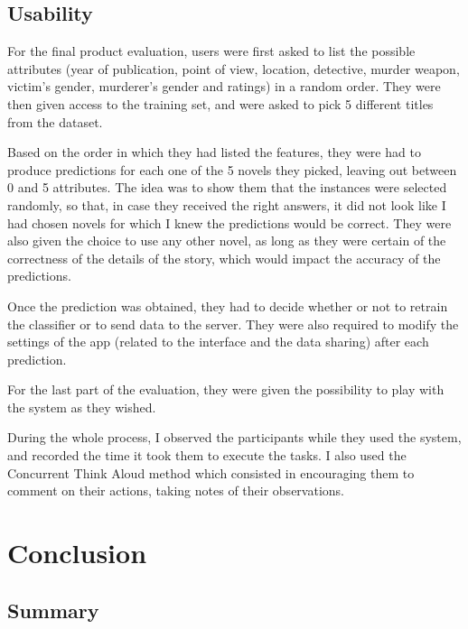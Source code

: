 \documentclass{mproj}
\begin{document}
\section{Usability}

For the final product evaluation, users were first asked to list the possible attributes (year of publication, point of view, location, detective, murder weapon, victim's gender, murderer's gender and ratings) in a random order. They were then given access to the training set, and were asked to pick 5 different titles from the dataset. \par

Based on the order in which they had listed the features, they were had to produce predictions for each one of the 5 novels they picked, leaving out between 0 and 5 attributes. The idea was to show them that the instances were selected randomly, so that, in case they received the right answers, it did not look like I had chosen novels for which I knew the predictions would be correct. They were also given the choice to use any other novel, as long as they were certain of the correctness of the details of the story, which would impact the accuracy of the predictions. \par 

Once the prediction was obtained, they had to decide whether or not to retrain the classifier or to send data to the server. They were also required to modify the settings of the app (related to the interface and the data sharing) after each prediction. \par

For the last part of the evaluation, they were given the possibility to play with the system as they wished.\par

During the whole process, I observed the participants while they used the system, and recorded the time it took them to execute the tasks. I also used the Concurrent Think Aloud method \cite{usabilitytest} which consisted in encouraging them to comment on their actions, taking notes of their observations.


\chapter{Conclusion}\label{conclusion}

\section{Summary}
\end{document}
